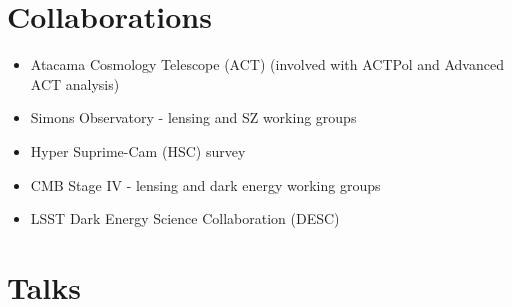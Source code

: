 \documentclass[10pt,margin]{res}
\begin{document}
\begin{resume}
\section{Collaborations}
\begin{itemize}
\item Atacama Cosmology Telescope (ACT) (involved with ACTPol and Advanced ACT analysis)
\item Simons Observatory - lensing and SZ working groups
\item Hyper Suprime-Cam (HSC) survey
\item CMB Stage IV - lensing and dark energy working groups
\item LSST Dark Energy Science Collaboration (DESC)
\end{itemize}

\section{Talks}


\end{resume}
\end{document}

